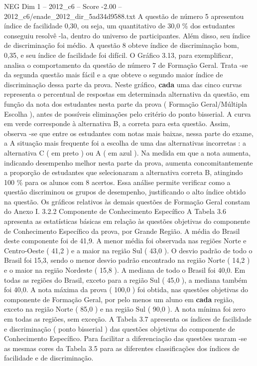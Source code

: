 \begin{textsample}{NEG Dim 1 – 2012\_c6 – Score -2.00 – 2012\_c6/enade\_2012\_dir\_5ad34d9588.txt}
A questão de número 5 apresentou índice de facilidade 0,30, ou seja, um quantitativo de 30,0 \% dos estudantes conseguiu resolvê -la, dentro do universo de participantes.
Além disso, seu índice de discriminação foi médio.
A questão 8 obteve índice de discriminação bom, 0,35, e seu índice de facilidade foi difícil.
O Gráfico 3.13, para exemplificar, analisa o comportamento da questão de número 7 de Formação Geral.
Trata -se da segunda questão mais fácil e a que obteve o segundo maior índice de discriminação dessa parte da prova.
Neste gráfico, \textbf{cada} uma das cinco curvas representa o percentual de respostas em determinada alternativa da questão, em função da nota dos estudantes nesta parte da prova ( Formação Geral/Múltipla Escolha ), antes de possíveis eliminações pelo critério do ponto bisserial.
A curva em verde corresponde à alternativa B, a correta para esta questão.
Assim, observa -se que entre os estudantes com notas mais baixas, nessa parte do exame, a A situação mais frequente foi a escolha de uma das alternativas incorretas : a alternativa C ( em preto ) ou A ( em azul ).
Na medida em que a nota aumenta, indicando desempenho melhor nesta parte da prova, aumenta concomitantemente a proporção de estudantes que selecionaram a alternativa correta B, atingindo 100 \% para os alunos com 8 acertos.
Essa análise permite verificar como a questão discriminou os grupos de desempenho, justificando o alto índice obtido na questão.
Os gráficos relativos às demais questões de Formação Geral constam do Anexo I. 3.2.2 Componente de Conhecimento Específico A Tabela 3.6 apresenta as estatísticas básicas em relação às questões objetivas do componente de Conhecimento Específico da prova, por Grande Região.
A média do Brasil deste componente foi de 41,9.
A menor média foi observada nas regiões Norte e Centro-Oeste ( 41,2 ) e a maior na região Sul ( 43,0 ).
O desvio padrão de todo o Brasil foi 15,3, sendo o menor desvio padrão encontrado na região Norte ( 14,2 ) e o maior na região Nordeste ( 15,8 ).
A mediana de todo o Brasil foi 40,0.
Em todas as regiões do Brasil, exceto para a região Sul ( 45,0 ), a mediana também foi 40,0.
A nota máxima da prova ( 100,0 ) foi obtida, nas questões objetivas do componente de Formação Geral, por pelo menos um aluno em \textbf{cada} região, exceto na região Norte ( 85,0 ) e na região Sul ( 90,0 ).
A nota mínima foi zero em todas as regiões, sem exceção.
A Tabela 3.7 apresenta os índices de facilidade e discriminação ( ponto bisserial ) das questões objetivas do componente de Conhecimento Específico.
Para facilitar a diferenciação das questões usaram -se as mesmas cores da Tabela 3.5 para as diferentes classificações dos índices de facilidade e de discriminação.

\end{textsample}
